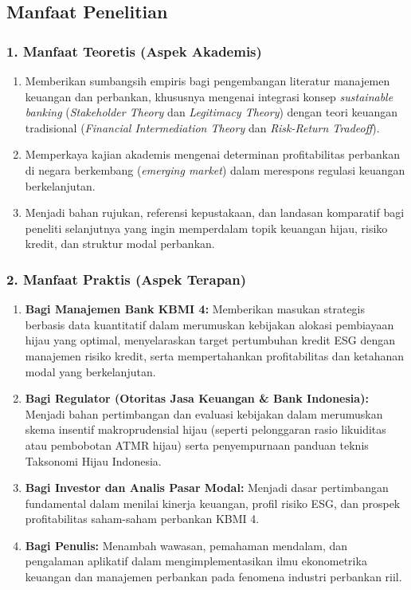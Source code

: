 \documentclass[12pt,a4paper]{article}
\numberwithin{equation}{section}
\begin{document}
\subsection{Manfaat Penelitian}

\subsubsection{1. Manfaat Teoretis (Aspek Akademis)}
\begin{enumerate}[label=\alph*.]
  \item Memberikan sumbangsih empiris bagi pengembangan literatur manajemen keuangan dan perbankan, khususnya mengenai integrasi konsep \emph{sustainable banking} (\emph{Stakeholder Theory} dan \emph{Legitimacy Theory}) dengan teori keuangan tradisional (\emph{Financial Intermediation Theory} dan \emph{Risk-Return Tradeoff}).
  \item Memperkaya kajian akademis mengenai determinan profitabilitas perbankan di negara berkembang (\emph{emerging market}) dalam merespons regulasi keuangan berkelanjutan.
  \item Menjadi bahan rujukan, referensi kepustakaan, dan landasan komparatif bagi peneliti selanjutnya yang ingin memperdalam topik keuangan hijau, risiko kredit, dan struktur modal perbankan.
\end{enumerate}

\subsubsection{2. Manfaat Praktis (Aspek Terapan)}
\begin{enumerate}[label=\alph*.]
  \item \textbf{Bagi Manajemen Bank KBMI 4:} Memberikan masukan strategis berbasis data kuantitatif dalam merumuskan kebijakan alokasi pembiayaan hijau yang optimal, menyelaraskan target pertumbuhan kredit ESG dengan manajemen risiko kredit, serta mempertahankan profitabilitas dan ketahanan modal yang berkelanjutan.
  \item \textbf{Bagi Regulator (Otoritas Jasa Keuangan \& Bank Indonesia):} Menjadi bahan pertimbangan dan evaluasi kebijakan dalam merumuskan skema insentif makroprudensial hijau (seperti pelonggaran rasio likuiditas atau pembobotan ATMR hijau) serta penyempurnaan panduan teknis Taksonomi Hijau Indonesia.
  \item \textbf{Bagi Investor dan Analis Pasar Modal:} Menjadi dasar pertimbangan fundamental dalam menilai kinerja keuangan, profil risiko ESG, dan prospek profitabilitas saham-saham perbankan KBMI 4.
  \item \textbf{Bagi Penulis:} Menambah wawasan, pemahaman mendalam, dan pengalaman aplikatif dalam mengimplementasikan ilmu ekonometrika keuangan dan manajemen perbankan pada fenomena industri perbankan riil.
\end{enumerate}
\end{document}
